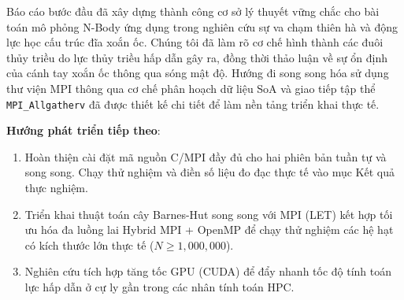 \documentclass[12pt]{article}
\begin{document}
Báo cáo bước đầu đã xây dựng thành công cơ sở lý thuyết vững chắc cho bài toán mô phỏng N-Body ứng dụng trong nghiên cứu sự va chạm thiên hà và động lực học cấu trúc đĩa xoắn ốc. Chúng tôi đã làm rõ cơ chế hình thành các đuôi thủy triều do lực thủy triều hấp dẫn gây ra, đồng thời thảo luận về sự ổn định của cánh tay xoắn ốc thông qua sóng mật độ. Hướng đi song song hóa sử dụng thư viện MPI thông qua cơ chế phân hoạch dữ liệu SoA và giao tiếp tập thể \texttt{MPI\_Allgatherv} đã được thiết kế chi tiết để làm nền tảng triển khai thực tế.

\textbf{Hướng phát triển tiếp theo}:
\begin{enumerate}
    \item Hoàn thiện cài đặt mã nguồn C/MPI đầy đủ cho hai phiên bản tuần tự và song song. Chạy thử nghiệm và điền số liệu đo đạc thực tế vào mục Kết quả thực nghiệm.
    \item Triển khai thuật toán cây Barnes-Hut song song với MPI (LET) kết hợp tối ưu hóa đa luồng lai Hybrid MPI + OpenMP để chạy thử nghiệm các hệ hạt có kích thước lớn thực tế ($N \ge 1,000,000$).
    \item Nghiên cứu tích hợp tăng tốc GPU (CUDA) để đẩy nhanh tốc độ tính toán lực hấp dẫn ở cự ly gần trong các nhân tính toán HPC.
\end{enumerate}
\end{document}
